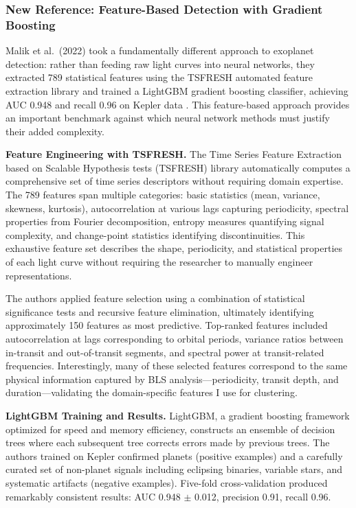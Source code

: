 \documentclass[letterpaper]{article} %
\begin{document}
\subsubsection{New Reference: Feature-Based Detection with Gradient Boosting}

Malik et al.\ (2022) took a fundamentally different approach to exoplanet detection: rather than feeding raw light curves into neural networks, they extracted 789 statistical features using the TSFRESH automated feature extraction library and trained a LightGBM gradient boosting classifier, achieving AUC 0.948 and recall 0.96 on Kepler data \cite{Malik2022exoplanetdetection}. This feature-based approach provides an important benchmark against which neural network methods must justify their added complexity.

\textbf{Feature Engineering with TSFRESH.} The Time Series Feature Extraction based on Scalable Hypothesis tests (TSFRESH) library automatically computes a comprehensive set of time series descriptors without requiring domain expertise. The 789 features span multiple categories: basic statistics (mean, variance, skewness, kurtosis), autocorrelation at various lags capturing periodicity, spectral properties from Fourier decomposition, entropy measures quantifying signal complexity, and change-point statistics identifying discontinuities. This exhaustive feature set describes the shape, periodicity, and statistical properties of each light curve without requiring the researcher to manually engineer representations.

The authors applied feature selection using a combination of statistical significance tests and recursive feature elimination, ultimately identifying approximately 150 features as most predictive. Top-ranked features included autocorrelation at lags corresponding to orbital periods, variance ratios between in-transit and out-of-transit segments, and spectral power at transit-related frequencies. Interestingly, many of these selected features correspond to the same physical information captured by BLS analysis---periodicity, transit depth, and duration---validating the domain-specific features I use for clustering.

\textbf{LightGBM Training and Results.} LightGBM, a gradient boosting framework optimized for speed and memory efficiency, constructs an ensemble of decision trees where each subsequent tree corrects errors made by previous trees. The authors trained on Kepler confirmed planets (positive examples) and a carefully curated set of non-planet signals including eclipsing binaries, variable stars, and systematic artifacts (negative examples). Five-fold cross-validation produced remarkably consistent results: AUC 0.948 $\pm$ 0.012, precision 0.91, recall 0.96.
\end{document}

